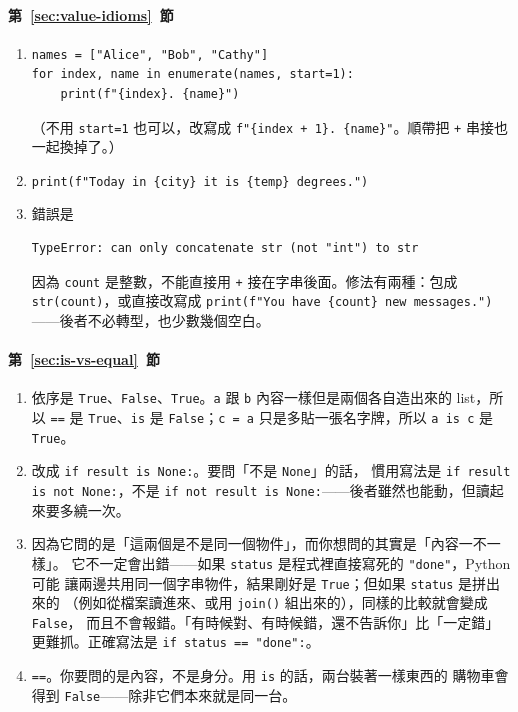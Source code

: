 \paragraph{第~\ref{sec:value-idioms}~節}
\begin{enumerate}
\item
\begin{verbatim}
names = ["Alice", "Bob", "Cathy"]
for index, name in enumerate(names, start=1):
    print(f"{index}. {name}")
\end{verbatim}
（不用 \texttt{start=1} 也可以，改寫成 \texttt{f"\{index + 1\}. \{name\}"}。順帶把
\texttt{+} 串接也一起換掉了。）
\item \texttt{print(f"Today in \{city\} it is \{temp\} degrees.")}
\item 錯誤是
\begin{verbatim}
TypeError: can only concatenate str (not "int") to str
\end{verbatim}
因為 \texttt{count} 是整數，不能直接用 \texttt{+} 接在字串後面。修法有兩種：包成
\texttt{str(count)}，或直接改寫成
\texttt{print(f"You have \{count\} new messages.")}——後者不必轉型，也少數幾個空白。
\end{enumerate}

\paragraph{第~\ref{sec:is-vs-equal}~節}
\begin{enumerate}
\item 依序是 \texttt{True}、\texttt{False}、\texttt{True}。\texttt{a} 跟 \texttt{b}
內容一樣但是兩個各自造出來的 list，所以 \texttt{==} 是 \texttt{True}、\texttt{is} 是
\texttt{False}；\texttt{c = a} 只是多貼一張名字牌，所以 \texttt{a is c} 是 \texttt{True}。
\item 改成 \texttt{if result is None:}。要問「不是 \texttt{None}」的話，
慣用寫法是 \texttt{if result is not None:}，不是
\texttt{if not result is None:}——後者雖然也能動，但讀起來要多繞一次。
\item 因為它問的是「這兩個是不是同一個物件」，而你想問的其實是「內容一不一樣」。
它不一定會出錯——如果 \texttt{status} 是程式裡直接寫死的 \texttt{"done"}，Python 可能
讓兩邊共用同一個字串物件，結果剛好是 \texttt{True}；但如果 \texttt{status} 是拼出來的
（例如從檔案讀進來、或用 \texttt{join()} 組出來的），同樣的比較就會變成 \texttt{False}，
而且不會報錯。「有時候對、有時候錯，還不告訴你」比「一定錯」更難抓。正確寫法是
\texttt{if status == "done":}。
\item \texttt{==}。你要問的是內容，不是身分。用 \texttt{is} 的話，兩台裝著一樣東西的
購物車會得到 \texttt{False}——除非它們本來就是同一台。
\end{enumerate}

